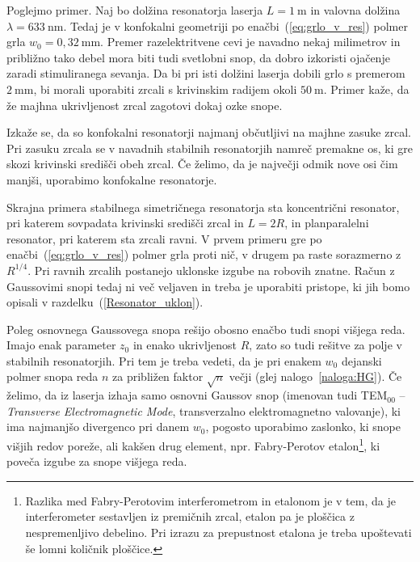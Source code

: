 Poglejmo primer. Naj bo dolžina resonatorja laserja $L=1~\si{\metre}$ in valovna
dolžina $\lambda = 633~\si{\nano\metre}$. Tedaj je v konfokalni geometriji po enačbi~(\ref{eq:grlo_v_res})
polmer grla $w_{0}=0,32~\si{\milli\metre}$. Premer razelektritvene cevi je navadno
nekaj milimetrov in približno tako debel mora biti tudi svetlobni
snop, da dobro izkoristi ojačenje zaradi stimuliranega sevanja.
Da bi pri isti dolžini laserja dobili grlo s premerom $2~\si{\milli\metre}$, bi morali
uporabiti zrcali s krivinskim radijem okoli $50~\si{\metre}$. 
Primer kaže, da že majhna ukrivljenost zrcal zagotovi dokaj ozke snope.

\begin{remark}
Izkaže se, da so konfokalni resonatorji najmanj občutljivi na majhne zasuke zrcal. 
Pri zasuku zrcala se v navadnih stabilnih resonatorjih namreč premakne os, ki gre skozi 
krivinski središči obeh zrcal. Če želimo, da je največji odmik nove osi čim
manjši, uporabimo konfokalne resonatorje. 
\end{remark}

Skrajna primera stabilnega simetričnega resonatorja sta 
koncentrični resonator,
pri katerem sovpadata krivinski središči zrcal in $L=2R$, in planparalelni 
resonator, pri katerem sta zrcali ravni.
V prvem primeru gre po enačbi~(\ref{eq:grlo_v_res}) polmer grla proti nič, v drugem pa raste sorazmerno
z $R^{1/4}$. Pri ravnih zrcalih postanejo uklonske
izgube na robovih znatne. Račun z Gaussovimi snopi tedaj ni več veljaven
in treba je uporabiti pristope, ki jih bomo opisali
v razdelku~(\ref{Resonator_uklon}).

Poleg osnovnega Gaussovega snopa rešijo obosno enačbo tudi snopi višjega reda. 
Imajo enak parameter $z_{0}$ in enako ukrivljenost $R$, zato so tudi 
rešitve za polje v stabilnih
resonatorjih. Pri tem je treba vedeti, da je pri enakem $w_{0}$
dejanski polmer snopa reda $n$ za približen faktor $\sqrt{n}$ večji 
(glej nalogo~\ref{naloga:HG}). Če želimo, da iz laserja izhaja samo 
osnovni Gaussov snop (imenovan tudi TEM$_{00}$ -- {\it Transverse Electromagnetic Mode}, 
transverzalno elektromagnetno valovanje), ki ima najmanjšo 
divergenco pri danem $w_0$, pogosto uporabimo zaslonko, ki snope višjih redov poreže, 
ali kakšen drug element, npr. Fabry-Perotov etalon\footnote{Razlika med Fabry-Perotovim
interferometrom in etalonom je v tem, da je interferometer sestavljen iz premičnih 
zrcal, etalon pa je ploščica z nespremenljivo debelino. Pri izrazu za prepustnost etalona
je treba upoštevati še lomni količnik ploščice.}, ki poveča izgube za snope višjega reda.
 
